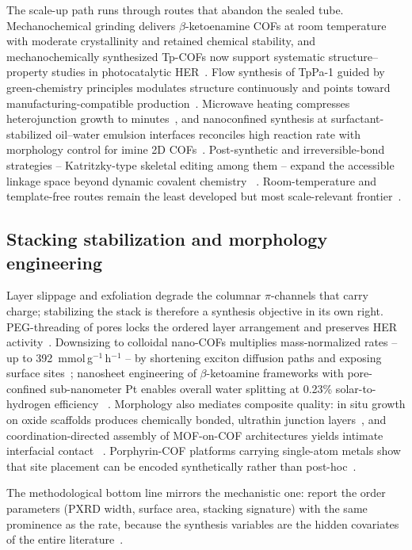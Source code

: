 The scale-up path runs through routes that abandon the sealed tube.
Mechanochemical grinding delivers $\beta$-ketoenamine COFs at room
temperature with moderate crystallinity and retained chemical stability,
and mechanochemically synthesized Tp-COFs now support systematic
structure--property studies in photocatalytic HER~\cite{asokan2026structure}.
Flow synthesis of TpPa-1 guided by green-chemistry principles modulates
structure continuously and points toward manufacturing-compatible
production~\cite{xu2026structural}. Microwave heating compresses
heterojunction growth to minutes~\cite{gao2025microwave,gao2025microwavex,
zhang2026bifunctional}, and nanoconfined synthesis at surfactant-stabilized
oil--water emulsion interfaces reconciles high reaction rate with morphology
control for imine 2D COFs~\cite{ma2024rapid}. Post-synthetic and
irreversible-bond strategies -- Katritzky-type skeletal editing among them --
expand the accessible linkage space beyond dynamic covalent chemistry
~\cite{pan2025rational}. Room-temperature and template-free routes remain
the least developed but most scale-relevant frontier~\cite{wu2025recent}.

\subsection{Stacking stabilization and morphology engineering}

Layer slippage and exfoliation degrade the columnar $\pi$-channels that
carry charge; stabilizing the stack is therefore a synthesis objective in
its own right. PEG-threading of pores locks the ordered layer arrangement
and preserves HER activity~\cite{zhou2021peg}. Downsizing to colloidal
nano-COFs multiplies mass-normalized rates -- up to
392~mmol\,g$^{-1}$\,h$^{-1}$ -- by shortening exciton diffusion paths and
exposing surface sites~\cite{zhao2024nanoscale}; nanosheet engineering of
$\beta$-ketoamine frameworks with pore-confined sub-nanometer Pt enables
overall water splitting at 0.23\% solar-to-hydrogen efficiency
~\cite{yang2023engineering}. Morphology also mediates composite quality:
in situ growth on oxide scaffolds produces chemically bonded, ultrathin
junction layers~\cite{shen2023in,niu2026fluorine}, and coordination-directed
assembly of MOF-on-COF architectures yields intimate interfacial contact
~\cite{ma2024ii,qi2026construction}. Porphyrin-COF platforms carrying
single-atom metals show that site placement can be encoded synthetically
rather than post-hoc~\cite{he2023porphyrin,chen2021rational}.

The methodological bottom line mirrors the mechanistic one: report the
order parameters (PXRD width, surface area, stacking signature) with the
same prominence as the rate, because the synthesis variables are the
hidden covariates of the entire literature~\cite{qin2024structural,
ghosh2020identification}.
